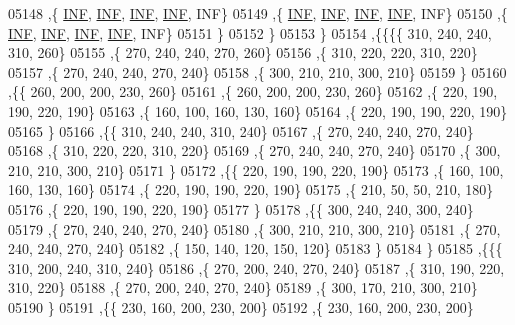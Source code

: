 \begin{DoxyCode}
05148     ,\{   \hyperlink{constants_8h_a12c2040f25d8e3a7b9e1c2024c618cb6}{INF},   \hyperlink{constants_8h_a12c2040f25d8e3a7b9e1c2024c618cb6}{INF},   \hyperlink{constants_8h_a12c2040f25d8e3a7b9e1c2024c618cb6}{INF},   \hyperlink{constants_8h_a12c2040f25d8e3a7b9e1c2024c618cb6}{INF},   INF\}
05149     ,\{   \hyperlink{constants_8h_a12c2040f25d8e3a7b9e1c2024c618cb6}{INF},   \hyperlink{constants_8h_a12c2040f25d8e3a7b9e1c2024c618cb6}{INF},   \hyperlink{constants_8h_a12c2040f25d8e3a7b9e1c2024c618cb6}{INF},   \hyperlink{constants_8h_a12c2040f25d8e3a7b9e1c2024c618cb6}{INF},   INF\}
05150     ,\{   \hyperlink{constants_8h_a12c2040f25d8e3a7b9e1c2024c618cb6}{INF},   \hyperlink{constants_8h_a12c2040f25d8e3a7b9e1c2024c618cb6}{INF},   \hyperlink{constants_8h_a12c2040f25d8e3a7b9e1c2024c618cb6}{INF},   \hyperlink{constants_8h_a12c2040f25d8e3a7b9e1c2024c618cb6}{INF},   INF\}
05151     \}
05152    \}
05153   \}
05154  ,\{\{\{\{   310,   240,   240,   310,   260\}
05155     ,\{   270,   240,   240,   270,   260\}
05156     ,\{   310,   220,   220,   310,   220\}
05157     ,\{   270,   240,   240,   270,   240\}
05158     ,\{   300,   210,   210,   300,   210\}
05159     \}
05160    ,\{\{   260,   200,   200,   230,   260\}
05161     ,\{   260,   200,   200,   230,   260\}
05162     ,\{   220,   190,   190,   220,   190\}
05163     ,\{   160,   100,   160,   130,   160\}
05164     ,\{   220,   190,   190,   220,   190\}
05165     \}
05166    ,\{\{   310,   240,   240,   310,   240\}
05167     ,\{   270,   240,   240,   270,   240\}
05168     ,\{   310,   220,   220,   310,   220\}
05169     ,\{   270,   240,   240,   270,   240\}
05170     ,\{   300,   210,   210,   300,   210\}
05171     \}
05172    ,\{\{   220,   190,   190,   220,   190\}
05173     ,\{   160,   100,   160,   130,   160\}
05174     ,\{   220,   190,   190,   220,   190\}
05175     ,\{   210,    50,    50,   210,   180\}
05176     ,\{   220,   190,   190,   220,   190\}
05177     \}
05178    ,\{\{   300,   240,   240,   300,   240\}
05179     ,\{   270,   240,   240,   270,   240\}
05180     ,\{   300,   210,   210,   300,   210\}
05181     ,\{   270,   240,   240,   270,   240\}
05182     ,\{   150,   140,   120,   150,   120\}
05183     \}
05184    \}
05185   ,\{\{\{   310,   200,   240,   310,   240\}
05186     ,\{   270,   200,   240,   270,   240\}
05187     ,\{   310,   190,   220,   310,   220\}
05188     ,\{   270,   200,   240,   270,   240\}
05189     ,\{   300,   170,   210,   300,   210\}
05190     \}
05191    ,\{\{   230,   160,   200,   230,   200\}
05192     ,\{   230,   160,   200,   230,   200\}

\end{DoxyCode}
